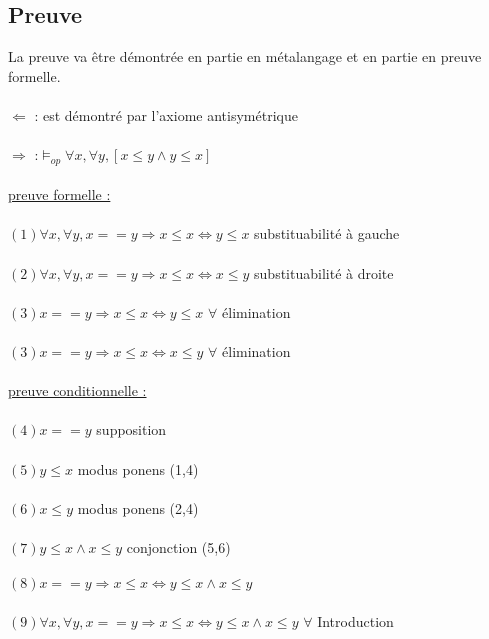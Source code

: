 \subsection{Preuve}
La preuve va être démontrée en partie en métalangage et en partie en preuve formelle.\\ \\
$\Leftarrow $ : est démontré par l'axiome antisymétrique\\ \\
$\Rightarrow$ :$\models_{op} \forall x, \forall y, [x\leq y \land y \leq x]$ \\ \\
\underline{preuve formelle :}\\ \\
$
 (1) \forall x, \forall y, x==y \Rightarrow x \leq x \Leftrightarrow y \leq x$ \hfill substituabilité à gauche \\ \\
$(2) \forall x, \forall y, x==y \Rightarrow x \leq x \Leftrightarrow x \leq y$ \hfill substituabilité à droite \\ \\
$(3) x==y \Rightarrow x \leq x \Leftrightarrow y \leq x $ \hfill $\forall$ élimination\\ \\
$(3) x==y \Rightarrow x \leq x \Leftrightarrow x \leq y $ \hfill $\forall$ élimination\\\\
\underline{preuve conditionnelle :}\\ \\
$(4) x==y$ \hfill supposition\\ \\
$(5) y\leq x$ \hfill modus ponens (1,4)\\ \\
$(6) x\leq y$ \hfill modus ponens (2,4)\\ \\
$(7) y\leq x \land  x\leq y$ \hfill conjonction (5,6)\\ \\
$(8) x==y \Rightarrow x \leq x \Leftrightarrow y\leq x \land  x\leq y$ \\ \\
$(9) \forall x, \forall y, x==y \Rightarrow x \leq x \Leftrightarrow y\leq x \land  x\leq y$ \hfill $\forall$ Introduction\\ \\
